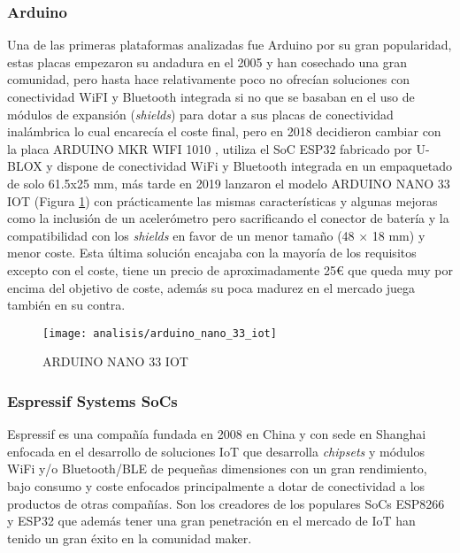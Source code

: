 \documentclass[../proyecto.tex]{subfiles}
\begin{document}
\subsubsection{Arduino}
Una de las primeras plataformas analizadas fue Arduino por su gran popularidad, estas placas empezaron su andadura en el 2005 y han cosechado una gran comunidad, pero hasta hace relativamente poco no ofrecían soluciones con conectividad WiFI y Bluetooth integrada si no que se basaban en el uso de módulos de expansión (\textit{shields}) para dotar a sus placas de conectividad inalámbrica lo cual encarecía el coste final, pero en 2018 decidieron cambiar con la placa ARDUINO MKR WIFI 1010 \cite{arduino_mkr_wifi_1010}, utiliza el SoC ESP32 fabricado por U-BLOX y dispone de conectividad WiFi y Bluetooth integrada en un empaquetado de solo 61.5x25 mm, más tarde en 2019 lanzaron el modelo ARDUINO NANO 33 IOT \cite{arduino_nano_33_iot} (Figura \ref{fig:arduino_nano_33_iot}) con prácticamente las mismas características y algunas mejoras como la inclusión de un acelerómetro pero sacrificando el conector de batería y la compatibilidad con los \textit{shields} en favor de un menor tamaño (48 × 18 mm) y menor coste. Esta última solución encajaba con la mayoría de los requisitos excepto con el coste, tiene un precio de aproximadamente 25€ que queda muy por encima del objetivo de coste, además su poca madurez en el mercado juega también en su contra.

\begin{figure}[H]
\centering
\texttt{[image: analisis/arduino\_nano\_33\_iot]}
\caption{ARDUINO NANO 33 IOT}
\label{fig:arduino_nano_33_iot}
\end{figure}

\subsubsection{Espressif Systems SoCs}
Espressif es una compañía fundada en 2008 en China y con sede en Shanghai enfocada en el desarrollo de soluciones IoT que desarrolla \textit{chipsets} y módulos WiFi y/o Bluetooth/BLE de pequeñas dimensiones con un gran rendimiento, bajo consumo y coste enfocados principalmente a dotar de conectividad a los productos de otras compañías. Son los creadores de los populares SoCs ESP8266 y ESP32 que además tener una gran penetración en el mercado de IoT han tenido un gran éxito en la comunidad maker.\\

\\
\end{document}
